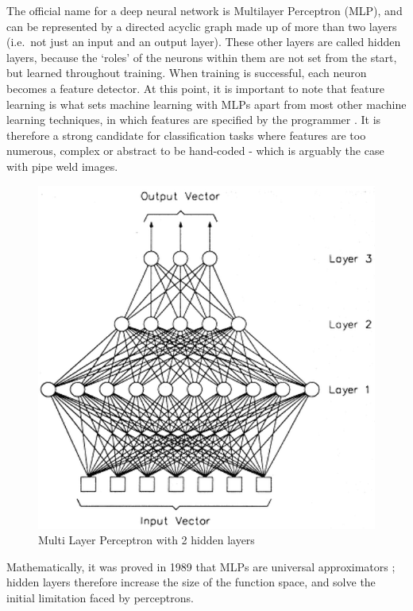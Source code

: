 \documentclass[a4paper,11pt]{article}
\begin{document}
The official name for a deep neural network is Multilayer Perceptron (MLP), and can be represented by a directed acyclic graph made up of more than two layers (i.e.\ not just an input and an output layer). These other layers are called hidden layers, because the `roles' of the neurons within them are not set from the start, but learned throughout training. When training is successful, each neuron becomes a feature detector. At this point, it is important to note that feature learning is what sets machine learning with MLPs apart from most other machine learning techniques, in which features are specified by the programmer \cite{DL-book}. It is therefore a strong candidate for classification tasks where features are too numerous, complex or abstract to be hand-coded - which is arguably the case with pipe weld images.\\ 

\begin{figure}[h!]
	\centering
	\includegraphics[scale=0.4]{images/MLP.png}
	\caption{Multi Layer Perceptron with 2 hidden layers}
\end{figure}

Mathematically, it was proved in 1989 that MLPs are universal approximators \cite{MLP-univ-approx}; hidden layers therefore increase the size of the function space, and solve the initial limitation faced by perceptrons. \\
\end{document}
